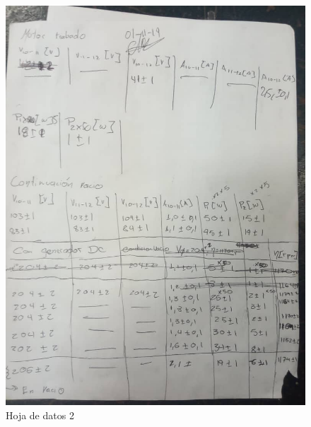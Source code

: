 \documentclass[11pt,letterpaper]{article}     %
\begin{document}
\begin{figure}[H]
	\centering
	\includegraphics[scale=0.6]{./recursos-Lab8/HojaDeDatos2.jpeg}
	\caption{Hoja de datos 2}
\end{figure}
\end{document}
